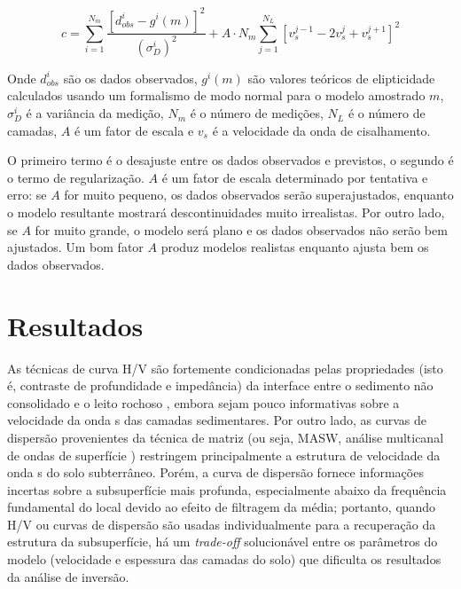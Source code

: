 \documentclass[smallextended]{svjour3}       %
\begin{document}
\begin{equation}\label{eq:cost_function}
  c = \sum_{i=1}^{N_m} \frac{[d_{obs}^i - g^i(m)]^2}{(\sigma^i_{D})^2} + A \cdot N_m \sum_{j=1}^{N_L} [v_s^{j - 1} - 2v_s^{j} + v_s^{j + 1}]^2 
\end{equation}

Onde $d_{obs}^i$ são os dados observados, $g^i(m)$ são valores teóricos de elipticidade calculados usando um formalismo de modo normal para o modelo amostrado $m$, $\sigma^i_{D}$ é a variância da medição, $N_m$ é o número de medições, $N_L$ é o número de camadas, $A$ é um fator de escala e $v_s$ é a velocidade da onda de cisalhamento. 

O primeiro termo é o desajuste entre os dados observados e previstos, o segundo é o termo de regularização. $A$ é um fator de escala determinado por tentativa e erro: se $A$ for muito pequeno, os dados observados serão superajustados, enquanto o modelo resultante mostrará descontinuidades muito irrealistas. Por outro lado, se $A$ for muito grande, o modelo será plano e os dados observados não serão bem ajustados. Um bom fator $A$ produz modelos realistas enquanto ajusta bem os dados observados. 


\section{Resultados}
\label{results}

As técnicas de curva H/V são fortemente condicionadas pelas propriedades (isto é, contraste de profundidade e impedância) da interface entre o sedimento não consolidado e o leito rochoso \citep{parolai2005joint}, embora sejam pouco informativas sobre a velocidade da onda s das camadas sedimentares. Por outro lado, as curvas de dispersão provenientes da técnica de matriz (ou seja, MASW, análise multicanal de ondas de superfície \citealp{park1999multichannel}) restringem principalmente a estrutura de velocidade da onda s do solo subterrâneo. Porém, a curva de dispersão fornece informações incertas sobre a subsuperfície mais profunda, especialmente abaixo da frequência fundamental do local devido ao efeito de filtragem da média; portanto, quando H/V ou curvas de dispersão são usadas individualmente para a recuperação da estrutura da subsuperfície, há um \textit{trade-off} solucionável entre os parâmetros do modelo (velocidade e espessura das camadas do solo) que dificulta os resultados da análise de inversão.
\end{document}
